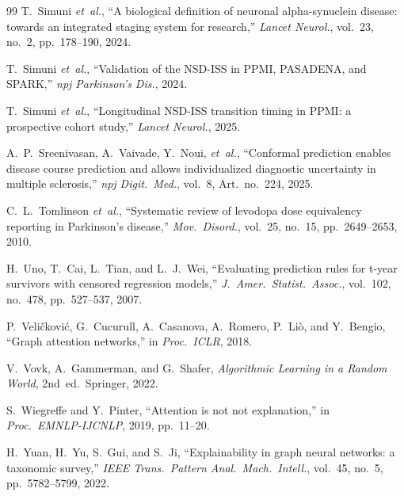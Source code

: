 \documentclass[11pt]{article}
\begin{document}
\begin{thebibliography}{99}
T.~Simuni \textit{et~al.}, ``A biological definition of neuronal alpha-synuclein disease: towards an integrated staging system for research,'' \textit{Lancet Neurol.}, vol.~23, no.~2, pp.~178--190, 2024.

T.~Simuni \textit{et~al.}, ``Validation of the NSD-ISS in PPMI, PASADENA, and SPARK,'' \textit{npj Parkinson's Dis.}, 2024.

T.~Simuni \textit{et~al.}, ``Longitudinal NSD-ISS transition timing in PPMI: a prospective cohort study,'' \textit{Lancet Neurol.}, 2025.

A.~P.~Sreenivasan, A.~Vaivade, Y.~Noui, \textit{et~al.}, ``Conformal prediction enables disease course prediction and allows individualized diagnostic uncertainty in multiple sclerosis,'' \textit{npj Digit.\ Med.}, vol.~8, Art.\ no.~224, 2025.

C.~L.~Tomlinson \textit{et~al.}, ``Systematic review of levodopa dose equivalency reporting in Parkinson's disease,'' \textit{Mov.\ Disord.}, vol.~25, no.~15, pp.~2649--2653, 2010.

H.~Uno, T.~Cai, L.~Tian, and L.~J.~Wei, ``Evaluating prediction rules for t-year survivors with censored regression models,'' \textit{J.\ Amer.\ Statist.\ Assoc.}, vol.~102, no.~478, pp.~527--537, 2007.

P.~Veli\v{c}kovi\'{c}, G.~Cucurull, A.~Casanova, A.~Romero, P.~Li\`{o}, and Y.~Bengio, ``Graph attention networks,'' in \textit{Proc.\ ICLR}, 2018.

V.~Vovk, A.~Gammerman, and G.~Shafer, \textit{Algorithmic Learning in a Random World}, 2nd~ed.\ Springer, 2022.

S.~Wiegreffe and Y.~Pinter, ``Attention is not not explanation,'' in \textit{Proc.\ EMNLP-IJCNLP}, 2019, pp.~11--20.

H.~Yuan, H.~Yu, S.~Gui, and S.~Ji, ``Explainability in graph neural networks: a taxonomic survey,'' \textit{IEEE Trans.\ Pattern Anal.\ Mach.\ Intell.}, vol.~45, no.~5, pp.~5782--5799, 2022.

\end{thebibliography}
\end{document}
